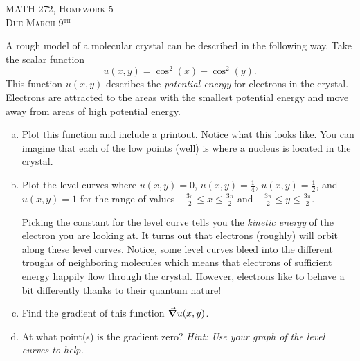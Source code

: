 \documentclass[12pt]{article} %
\begin{document}
\begin{center}
   \textsc{\large MATH 272, Homework 5}\\
   \textsc{Due March 9$^\textrm{th}$}
\end{center}
\vspace{.5cm}

\begin{problem}
A rough model of a molecular crystal can be described in the following way. Take the scalar function
\[
u(x,y)=\cos^2(x)+\cos^2(y).
\]
This function $u(x,y)$ describes the \emph{potential energy} for electrons in the crystal. Electrons are attracted to the areas with the smallest potential energy and move away from areas of high potential energy. 
\begin{enumerate}[(a)]
    \item Plot this function and include a printout.  Notice what this looks like.  You can imagine that each of the low points (well) is where a nucleus is located in the crystal.
    \item Plot the level curves where $u(x,y)=0$, $u(x,y)=\frac{1}{4}$, $u(x,y)=\frac{1}{2}$, and $u(x,y)=1$ for the range of values $-\frac{3\pi}{2}\leq x \leq \frac{3\pi}{2}$ and $-\frac{3\pi}{2}\leq y \leq \frac{3\pi}{2}$. 
    
    Picking the constant for the level curve tells you the \emph{kinetic energy} of the electron you are looking at.  It turns out that electrons (roughly) will orbit along these level curves.  Notice, some level curves bleed into the different troughs of neighboring molecules which means that electrons of sufficient energy happily flow through the crystal. However, electrons like to behave a bit differently thanks to their quantum nature!
    \item Find the gradient of this function $\boldsymbol{\vec{\nabla}} u(x,y)$.
    \item At what point(s) is the gradient zero? \emph{Hint: Use your graph of the level curves to help.}
    \end{enumerate}
\end{problem}
\end{document}
